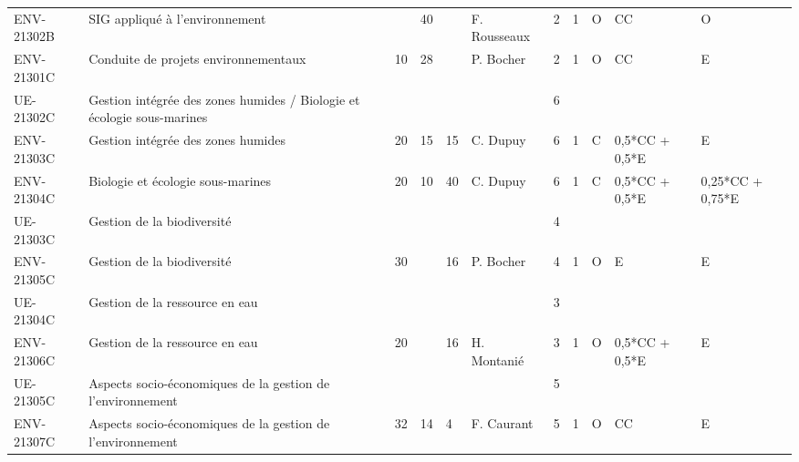 \documentclass[a4paper,11pt]{article}
\begin{document}
{{\begin{tabular}{lllllllllll}
ENV-21302B    & SIG appliqué à l'environnement                                                 &    & 40 &    & F. Rousseaux    & 2    & 1    & O           & CC               & O                \\
ENV-21301C    & Conduite de projets environnementaux                                           & 10 & 28 &    & P. Bocher       & 2    & 1    & O           & CC               & E                \\
\rowcolor[HTML]{C0C0C0} 
UE-21302C     & Gestion intégrée des zones humides / Biologie et écologie sous-marines         &    &    &    &                 & 6    &      &             &                  &                  \\
ENV-21303C    & Gestion intégrée des zones humides                                             & 20 & 15 & 15 & C. Dupuy        & 6    & 1    & C           & 0,5*CC + 0,5*E   & E                \\
ENV-21304C    & Biologie et écologie sous-marines                                              & 20 & 10 & 40 & C. Dupuy        & 6    & 1    & C           & 0,5*CC + 0,5*E   & 0,25*CC + 0,75*E \\
\rowcolor[HTML]{C0C0C0} 
UE-21303C     & Gestion de la biodiversité                                                     &    &    &    &                 & 4    &      &             &                  &                  \\
ENV-21305C    & Gestion de la biodiversité                                                     & 30 &    & 16 & P. Bocher       & 4    & 1    & O           & E                & E                \\
\rowcolor[HTML]{C0C0C0} 
UE-21304C     & Gestion de la ressource en eau                                                 &    &    &    &                 & 3    &      &             &                  &                  \\
ENV-21306C    & Gestion de la ressource en eau                                                 & 20 &    & 16 & H. Montanié     & 3    & 1    & O           & 0,5*CC + 0,5*E   & E                \\
\rowcolor[HTML]{C0C0C0} 
UE-21305C     & Aspects socio-économiques de la gestion de l'environnement                     &    &    &    &                 & 5    &      &             &                  &                  \\
ENV-21307C    & Aspects socio-économiques de la gestion de l'environnement                     & 32 & 14 & 4  & F. Caurant      & 5    & 1    & O           & CC               & E                \\

\end{tabular}}}
\end{document}
